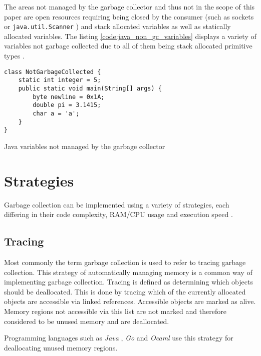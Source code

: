 The areas not managed by the garbage collector and thus not in the scope of
this paper are open resources requiring being closed by the consumer (such as
sockets or \texttt{java.util.Scanner} \cite[close]{java-util-scanner}) and
stack allocated variables as well as statically allocated variables. The
listing \autoref{code:java_non_gc_variables} displays a variety of variables
not garbage collected due to all of them being stack allocated primitive types
\cite[4.2. Primitive Types and Values]{java_language_spec_2023}.

\begin{listing}[H] 
    \begin{verbatim} 
class NotGarbageCollected {
    static int integer = 5;
    public static void main(String[] args) {
        byte newline = 0x1A;
        double pi = 3.1415;
        char a = 'a';
    }
}
    \end{verbatim}
    \caption{Java variables not managed by the garbage collector}
    \label{code:java_non_gc_variables}
\end{listing}

\section{Strategies}

Garbage collection can be implemented using a variety of strategies, each
differing in their code complexity, RAM/CPU usage and execution speed \cite[4.3
Benchmarks]{gc-performance_2004} \cite[Motivation and Historical
Perspective]{gc-hardware_2018}.

\subsection{Tracing}

Most commonly the term garbage collection is used to refer to tracing garbage
collection. This strategy of automatically managing memory is a common way of
implementing garbage collection. Tracing is defined as determining which
objects should be deallocated. This is done by tracing which of the currently
allocated objects are accessible via linked references. Accessible objects are
marked as alive. Memory regions not accessible via this list are not marked and
therefore considered to be unused memory and are deallocated. \cite[Garbage
Collection Background]{gc-hardware_2018}

Programming languages such as \textit{Java} \cite[2.2 Full GC
algorithm]{java_gc_comparison_2019}, \textit{Go} \cite[Tracing Garbage
Collection]{go_gcguide_2022} and \textit{Ocaml} \cite[Garbage Collection,
Reference Counting, and Explicit Allocation]{ocmal_gc_unknown} use this
strategy for deallocating unused memory regions.

